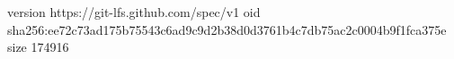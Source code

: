 version https://git-lfs.github.com/spec/v1
oid sha256:ee72c73ad175b75543c6ad9c9d2b38d0d3761b4c7db75ac2c0004b9f1fca375e
size 174916
